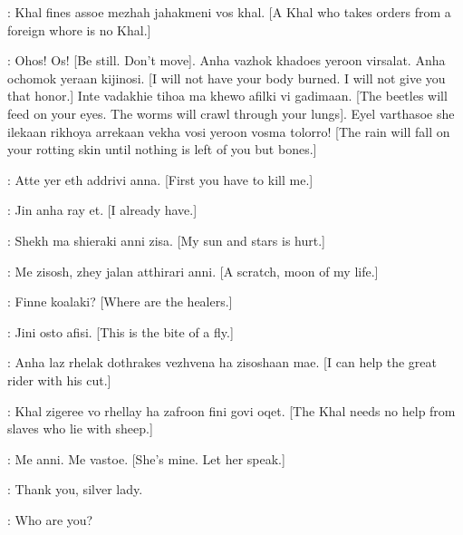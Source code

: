 \MAGO:  Khal fines assoe mezhah jahakmeni vos khal. [A Khal who takes orders from a foreign whore is no Khal.] 


\DROGO: Ohos! Os! [Be still. Don't move].  Anha vazhok khadoes yeroon virsalat. Anha ochomok yeraan kijinosi. [I will not have your body burned. I will not give you that honor.]  Inte vadakhie tihoa ma khewo afilki vi gadimaan. [The beetles will feed on your eyes. The worms will crawl through your lungs].  Eyel varthasoe she ilekaan rikhoya arrekaan vekha vosi yeroon vosma tolorro! [The rain will fall on your rotting skin until nothing is left of you but bones.] 


\MAGO: Atte yer eth addrivi anna. [First you have to kill me.] 

\DROGO: Jin anha ray et. [I already have.]


\DAENERYS:  Shekh ma shieraki anni zisa. [My sun and stars is hurt.] 

\DROGO: Me zisosh, zhey jalan atthirari anni. [A scratch, moon of my life.] 

\DAENERYS: Finne koalaki? [Where are the healers.] 

\DROGO: Jini osto afisi. [This is the bite of a fly.] 

\MIRRI: Anha laz rhelak dothrakes vezhvena ha zisoshaan mae. [I can help the great rider with his cut.] 

\QOTHO: Khal zigeree vo rhellay ha zafroon fini govi oqet. [The Khal needs no help from slaves who lie with sheep.] 

\DAENERYS: Me anni. Me vastoe. [She's mine. Let her speak.] 

\MIRRI: Thank you, silver lady. 

\DAENERYS: Who are you? 

